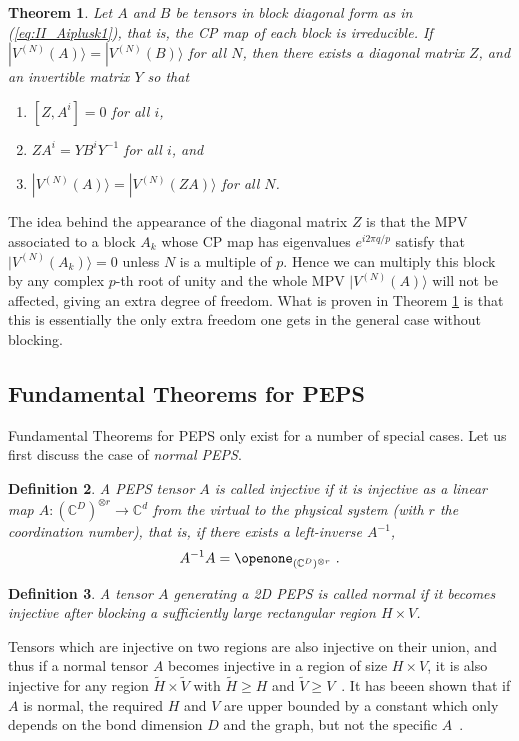 \documentclass[rmp,aps,reprint,superscriptaddress,nobalancelastpage]{revtex4-1}
\newtheorem{thm}{Theorem}[section]
\newtheorem{defn}[thm]{Definition}
\begin{document}
\begin{thm}\label{thm:fundamental-general}
    Let $A$ and $B$ be tensors in block diagonal form as in (\ref{eq:II_Aiplusk1}), that is, the CP map of each block is irreducible. If $|V^{(N)}(A)\rangle =|V^{(N)}(B)\rangle$ for all $N$, then there exists a diagonal matrix $Z$, and an invertible matrix $Y$ so that
    \begin{enumerate}
        \item[(i)] $[Z,A^{i}]=0$ for all $i$,
        \item[(ii)] $ZA^{i}=YB^i Y^{-1}$ for all $i$, and
        \item[(iii)] $|V^{(N)}(A)\rangle= |V^{(N)}(ZA)\rangle$ for all $N$.
    \end{enumerate}
\end{thm}
The idea behind the appearance of the diagonal matrix $Z$ is that the MPV associated to a block $A_k$ whose CP map has eigenvalues $e^{i 2\pi q/p}$ satisfy that $|V^{(N)}(A_k)\rangle =0$ unless $N$ is a multiple of $p$. Hence we can multiply this block by any complex $p$-th root of unity and the whole MPV $|V^{(N)}(A)\rangle$ will not be affected, giving an extra degree of freedom. What is proven in Theorem \ref{thm:fundamental-general} is that this is essentially the only extra freedom one gets in the general case without blocking.


\subsection{Fundamental Theorems for PEPS\label{sec:4:fund-thm-peps}}

Fundamental Theorems for PEPS only exist for a number of special cases.  Let us first discuss the case of  \emph{normal PEPS}.


\begin{defn}
    \label{def:4:injectivity}
    A PEPS tensor $A$  is called injective if it is injective as a linear map $A:
        (\mathbb C^D)^{\otimes r}\to\mathbb C^d$ from the virtual to the physical system (with $r$ the coordination number), that is, if there exists a left-inverse $A^{-1}$,
    \[
        A^{-1}A=\openone_{(\mathbb{C}^D)^{\otimes r}}\ .
    \]
\end{defn}

\begin{defn}
    A tensor $A$ generating a 2D PEPS is called \emph{normal} if it becomes injective after blocking a sufficiently large rectangular region $H\times V$.
\end{defn}
Tensors which are injective on two regions are also injective on their union, and thus if a normal tensor $A$ becomes injective in a region of size $H\times V$, it is also injective for any region $\tilde{H}\times \tilde{V}$ with $\tilde{H}\ge H$ and $\tilde{V}\ge V$~\cite{perez-garcia:parent-ham-2d,molnar:normal-peps-fundamentalthm}. It has beeen shown that if $A$ is normal, the required $H$ and $V$ are upper bounded by a constant which only depends on the bond dimension $D$ and the graph, but not the specific $A$~\cite{michalek:2d-quantum-wielandt}.
\end{document}

